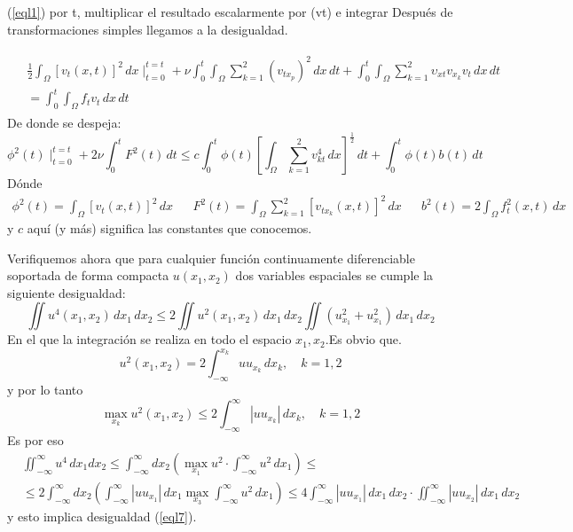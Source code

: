 (\ref{eql1}) por t, multiplicar el resultado escalarmente por (vt) e integrar
Después de transformaciones simples llegamos a la desigualdad.

\begin{align}
    \begin{split}
        &\frac{1}{2} \int_{\Omega}\left[v_t(x,t)\right]^2\,dx\mid_{t = 0}^{t = t} + \nu\int_0^t\int_{\Omega}\sum_{k = 1}^2\left(v_{tx_p}\right)^2\,dx\,dt + \int_0^t\int_{\Omega}\sum_{k = 1}^2 \upsilon_{xt} v_{x_k}v_t\,dx\,dt\\
        &= \int_0^t\int_{\Omega}f_tv_t\,dx\,dt
        \label{e}
    \end{split}
\end{align}
De donde se despeja:
\begin{equation}
    \phi^2(t)\mid_{t = 0}^{t = t} + 2\nu\int_0^t F^2(t)\,dt\leq c\int_0^t\phi(t)\left[\int_{\Omega}\sum_{k = 1}^2v^4_{kt}\,dx \right]^{\frac{1}{2}}\,dt +\int_0^t\phi(t)b(t)\,dt
    \label{eql6}
\end{equation}
Dónde
\begin{align*}
    \phi^2(t) = \int_{\Omega}\left[v_t(x,t)\right]^2\,dx&&F^2(t) = \int_{\Omega}\sum_{k = 1}^2\left[v_{tx_k}(x,t)\right]^2\,dx&& b^2(t) = 2\int_{\Omega} f^2_t(x,t)\,dx
\end{align*}
y $c$ aquí (y más) significa las constantes que conocemos.

Verifiquemos ahora que para cualquier función continuamente diferenciable soportada de forma compacta $u(x_1,x_2)$ dos variables espaciales se cumple la siguiente desigualdad:
\begin{equation}
    \iint u^4\left(x_1,x_2\right)\,dx_1\,dx_2\leq 2\iint u^2\left(x_1,x_2\right)\,dx_1\,dx_2\iint \left(u^{2}_{x_1} + u^{2}_{x_1} \right)\,dx_1\,dx_2
    \label{eql7}
\end{equation}
En el que la integración se realiza en todo el espacio $x_1, x_2$.Es obvio que.
\begin{equation*}
    u^2\left(x_1,x_2\right) = 2 \int_{ - \infty}^{x_k} uu_{x_k}\,dx_k,\quad k = 1,2
\end{equation*}
y por lo tanto
\begin{equation*}
    \max_{x_k}u^2 \left(x_1,x_2\right) \leq 2\int_{ - \infty}^{\infty}\left\lvert uu_{x_k}\right\rvert \,dx_k,\quad k = 1,2
\end{equation*}
Es por eso
\begin{align*}
    &\iint_{ -\infty}^{\infty}u^4\,dx_1dx_2 \leq \int_{ -\infty}^{\infty}dx_2\left(\max_{x_1}u^2\cdot\int_{ -\infty}^{\infty}u^2\,dx_1  \right)\leq  \\
    &\leq 2\int_{ -\infty }^{\infty}dx_2\left(\int_{ -\infty}^{\infty}\left\lvert uu_{x_1}\right\rvert \,dx_1 \max_{x_3}\int_{-\infty}^{\infty}u^2\,dx_1\right)\leq 4\int_{ -\infty}^{\infty}\left\lvert uu_{x_1} \right\rvert\,dx_1 \,dx_2\cdot \iint_{ -\infty}^{\infty}\left\lvert uu_{x_2}\right\rvert\,dx_1\,dx_2
\end{align*}
y esto implica desigualdad (\ref{eql7}).

